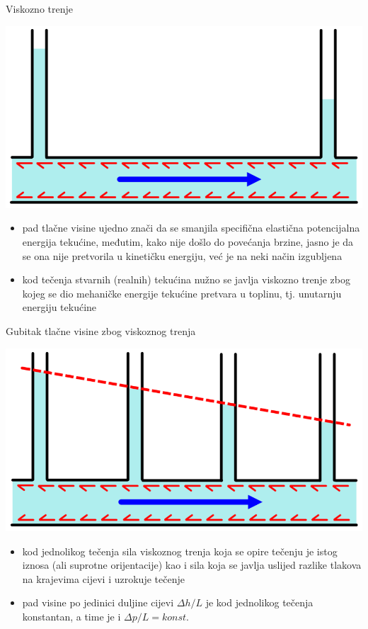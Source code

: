 \documentclass[croatian]{beamer}
\begin{document}
\begin{frame}{Viskozno trenje}

\begin{center}
\includegraphics[width=0.5\paperwidth]{slike/slika3.PNG}
\par\end{center}
\begin{itemize}
\item pad tlačne visine ujedno znači da se smanjila specifična elastična
potencijalna energija tekućine, međutim, kako nije došlo do povećanja
brzine, jasno je da se ona nije pretvorila u kinetičku energiju, već
je na neki način izgubljena
\item kod tečenja stvarnih (realnih) tekućina nužno se javlja viskozno trenje
zbog kojeg se dio mehaničke energije tekućine pretvara u toplinu,
tj. unutarnju energiju tekućine
\end{itemize}
\end{frame}

\begin{frame}{Gubitak tlačne visine zbog viskoznog trenja}

\begin{center}
\includegraphics[width=0.5\paperwidth]{slike/slika4.PNG}
\par\end{center}
\begin{itemize}
\item kod jednolikog tečenja sila viskoznog trenja koja se opire tečenju
je istog iznosa (ali suprotne orijentacije) kao i sila koja se javlja
uslijed razlike tlakova na krajevima cijevi i uzrokuje tečenje
\item pad visine po jedinici duljine cijevi $\Delta h/L$ je kod jednolikog
tečenja konstantan, a time je i $\Delta p/L=konst.$ 
\end{itemize}
\end{frame}
\end{document}
